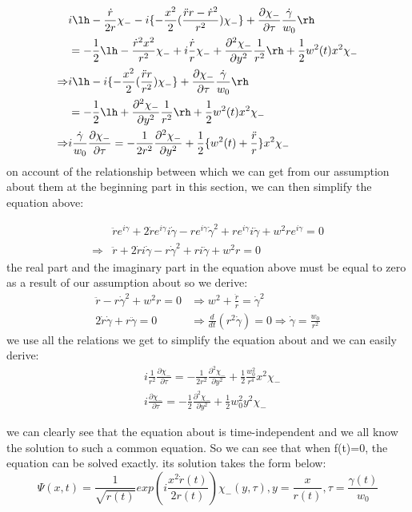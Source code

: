 \begin{frame}
\begin{align}
& i\lh -\frac{\dot{r}}{2r}\chi_- -i\{-\frac{x^2}{2}(\frac{\ddot{r}r-\dot{r}^2}{r^2})\chi_-\}+\frac{\partial\chi_-}{\partial\tau}\frac{\dot{\gamma}}{w_0}\rh\notag\\
&=-\frac{1}{2}\lh-\frac{\dot{r}^2x^2}{r^2}\chi_-+i\frac{\dot{r}}{r}\chi_-+\frac{\partial^2\chi_-}{\partial y^2}\frac{1}{r^2}\rh+\frac{1}{2}w^2(t)x^2\chi_-\notag\\
\Rightarrow & i\lh-i\{-\frac{x^2}{2}(\frac{\ddot{r}r}{r^2})\chi_-\}+\frac{\partial\chi_-}{\partial\tau}\frac{\dot{\gamma}}{w_0}\rh\notag\\
&=-\frac{1}{2}\lh+\frac{\partial^2\chi_-}{\partial y^2}\frac{1}{r^2}\rh+\frac{1}{2}w^2(t)x^2\chi_-\notag\\
\Rightarrow &i\frac{\dot{\gamma}}{w_0}\frac{\partial\chi_-}{\partial\tau}=-\frac{1}{2r^2}\frac{\partial^2\chi_-}{\partial y^2}+\frac{1}{2}\{w^2(t)+\frac{\ddot{r}}{r}\}x^2\notag\chi_-\label{eq:jianhua}
\end{align}
on account of the relationship between  which we can get from our assumption about them at the beginning part in this section, we can then simplify the equation above:
\end{frame}
\begin{frame}
\begin{align*}
&\ddot{r}e^{i\gamma}+2\dot{r}e^{i\gamma}i\dot{\gamma}-re^{i\gamma}\dot{\gamma}^2+re^{i\gamma}i\ddot{\gamma}+w^2 re^{i\gamma}=0\\
\Rightarrow &\ddot{r}+2\dot{r}i\dot{\gamma}-r\dot{\gamma}^2+r i\ddot{\gamma}+w^2 r=0
\end{align*}
the real part and the imaginary part in the equation above must be equal to zero as a result of our assumption about	so we derive:
\begin{align*}
\ddot{r}-r\dot{\gamma}^2+w^2r=0&\Rightarrow w^2+\frac{\ddot{r}}{r}=\dot{\gamma}^2\\
2\dot{r}\dot{\gamma}+r\ddot{\gamma}=0&\Rightarrow \frac{d}{dt}(r^2\dot{\gamma})=0\Rightarrow \dot{\gamma}=\frac{w_0}{r^2}
\end{align*}
we use all the relations we get to simplify the equation about 	 and we can easily derive:	
\begin{align*}
&i\frac{1}{r^2}\frac{\partial\chi_-}{\partial\tau}=-\frac{1}{2r^2}\frac{\partial^2\chi_-}{\partial y^2}+\frac{1}{2}\frac{w_0^2}{r^4} x^2\chi_-\\
&i\frac{\partial\chi_-}{\partial\tau}=-\frac{1}{2}\frac{\partial^2\chi_-}{\partial y^2}+\frac{1}{2}w_0^2 y^2\chi_-
\end{align*}
\end{frame}
\begin{frame}
we can clearly see that the equation about is time-independent and we all know the solution to such a common equation. So we can see that when f(t)=0, the equation can be solved exactly. its solution takes the form below:
\[\Psi(x,t)=\frac{1}{\sqrt{r(t)}}exp(i\frac{x^2\dot{r}(t)}{2r(t)})\chi_- (y,\tau),y=\frac{x}{r(t)},\tau=\frac{\gamma(t)}{w_0}\]
\end{frame}



